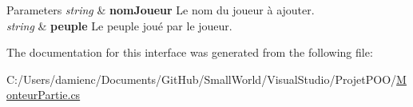 \begin{DoxyParams}{Parameters}
{\em string} & {\bfseries nom\-Joueur} Le nom du joueur à ajouter. \\
\hline
{\em string} & {\bfseries peuple} Le peuple joué par le joueur. \\
\hline
\end{DoxyParams}


The documentation for this interface was generated from the following file\-:\begin{DoxyCompactItemize}
\item 
C\-:/\-Users/damienc/\-Documents/\-Git\-Hub/\-Small\-World/\-Visual\-Studio/\-Projet\-P\-O\-O/\hyperlink{_monteur_partie_8cs}{Monteur\-Partie.\-cs}\end{DoxyCompactItemize}
